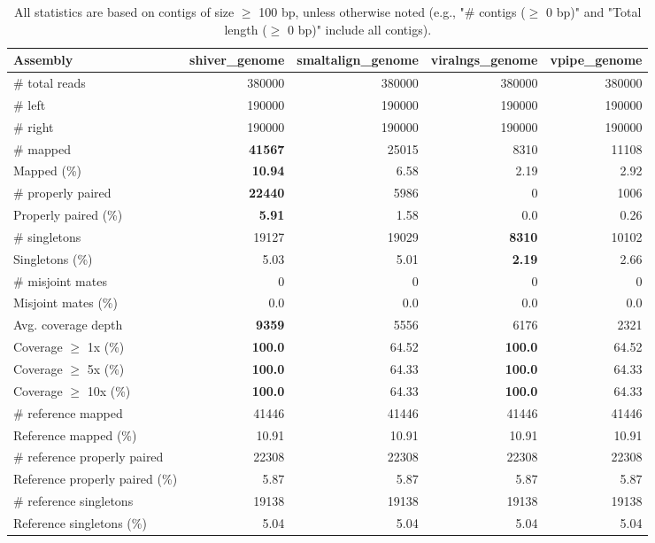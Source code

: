 \documentclass[12pt,a4paper]{article}
\begin{document}
\begin{table}[ht]
\begin{center}
\caption{All statistics are based on contigs of size $\geq$ 100 bp, unless otherwise noted (e.g., "\# contigs ($\geq$ 0 bp)" and "Total length ($\geq$ 0 bp)" include all contigs).}
\begin{tabular}{|l*{4}{|r}|}
\hline
Assembly & shiver\_genome & smaltalign\_genome & viralngs\_genome & vpipe\_genome \\ \hline
\# total reads & 380000 & 380000 & 380000 & 380000 \\ \hline
\# left & 190000 & 190000 & 190000 & 190000 \\ \hline
\# right & 190000 & 190000 & 190000 & 190000 \\ \hline
\# mapped & {\bf 41567} & 25015 & 8310 & 11108 \\ \hline
Mapped (\%) & {\bf 10.94} & 6.58 & 2.19 & 2.92 \\ \hline
\# properly paired & {\bf 22440} & 5986 & 0 & 1006 \\ \hline
Properly paired (\%) & {\bf 5.91} & 1.58 & 0.0 & 0.26 \\ \hline
\# singletons & 19127 & 19029 & {\bf 8310} & 10102 \\ \hline
Singletons (\%) & 5.03 & 5.01 & {\bf 2.19} & 2.66 \\ \hline
\# misjoint mates & 0 & 0 & 0 & 0 \\ \hline
Misjoint mates (\%) & 0.0 & 0.0 & 0.0 & 0.0 \\ \hline
Avg. coverage depth & {\bf 9359} & 5556 & 6176 & 2321 \\ \hline
Coverage $\geq$ 1x (\%) & {\bf 100.0} & 64.52 & {\bf 100.0} & 64.52 \\ \hline
Coverage $\geq$ 5x (\%) & {\bf 100.0} & 64.33 & {\bf 100.0} & 64.33 \\ \hline
Coverage $\geq$ 10x (\%) & {\bf 100.0} & 64.33 & {\bf 100.0} & 64.33 \\ \hline
\# reference mapped & 41446 & 41446 & 41446 & 41446 \\ \hline
Reference mapped (\%) & 10.91 & 10.91 & 10.91 & 10.91 \\ \hline
\# reference properly paired & 22308 & 22308 & 22308 & 22308 \\ \hline
Reference properly paired (\%) & 5.87 & 5.87 & 5.87 & 5.87 \\ \hline
\# reference singletons & 19138 & 19138 & 19138 & 19138 \\ \hline
Reference singletons (\%) & 5.04 & 5.04 & 5.04 & 5.04 \\ \hline

\end{tabular}
\end{center}
\end{table}
\end{document}
